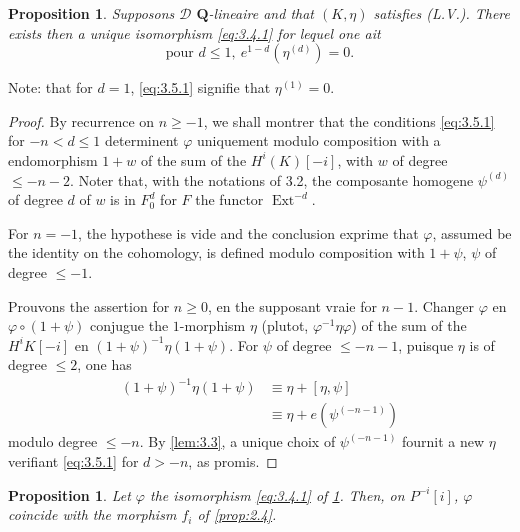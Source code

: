 \documentclass[11pt,a4paper]{article}
\theoremstyle{plain}
\newtheorem{proposition}[theorem]{Proposition}
\theoremstyle{definition}
\DeclareMathOperator{\Ext}{Ext}
\newcommand{\cD}{\mathscr{D}}
\newcommand{\bQ}{\mathbf{Q}}
\begin{document}
\begin{proposition}\label{prop:3.5}
Supposons $\cD$ $\bQ$-lineaire and that $(K,\eta)$ satisfies (L.V.). There exists then a unique isomorphism \eqref{eq:3.4.1} for lequel one ait
\begin{equation}\label{eq:3.5.1}
\text{pour } d \leqslant 1,\ e^{1-d}(\eta^{(d)}) = 0.
\end{equation}
\end{proposition}

Note: that for $d=1$, \eqref{eq:3.5.1} signifie that $\eta^{(1)} = 0$.

\begin{proof}
By recurrence on $n \geqslant -1$, we shall montrer that the conditions \eqref{eq:3.5.1} for $-n < d \leqslant 1$ determinent $\varphi$ uniquement modulo composition with a endomorphism $1+w$ of the sum of the $H^i(K)[-i]$, with $w$ of degree $\leqslant -n-2$. Noter that, with the notations of 3.2, the composante homogene $\psi^{(d)}$ of degree $d$ of $w$ is in $F_0^d$ for $F$ the functor $\Ext^{-d}$.

For $n=-1$, the hypothese is vide and the conclusion exprime that $\varphi$, assumed be the identity on the cohomology, is defined modulo composition with $1+\psi$, $\psi$ of degree $\leqslant -1$.

Prouvons the assertion for $n \geqslant 0$, en the supposant vraie for $n-1$. Changer $\varphi$ en $\varphi \circ (1+\psi)$ conjugue the $1$-morphism $\eta$ (plutot, $\varphi^{-1}\eta\varphi$) of the sum of the $H^iK[-i]$ en $(1+\psi)^{-1}\eta(1+\psi)$. For $\psi$ of degree $\leqslant -n-1$, puisque $\eta$ is of degree $\leqslant 2$, one has
\begin{align*}
(1+\psi)^{-1}\eta(1+\psi) &\equiv \eta + [\eta,\psi] \\
&\equiv \eta + e(\psi^{(-n-1)})
\end{align*}
modulo degree $\leqslant -n$. By \ref{lem:3.3}, a unique choix of $\psi^{(-n-1)}$ fournit a new $\eta$ verifiant \eqref{eq:3.5.1} for $d > -n$, as promis.
\end{proof}

\begin{proposition}\label{prop:3.6}
Let $\varphi$ the isomorphism \eqref{eq:3.4.1} of \ref{prop:3.5}. Then, on $P^{-i}[i]$, $\varphi$ coincide with the morphism $f_i$ of \ref{prop:2.4}.
\end{proposition}
\end{document}

